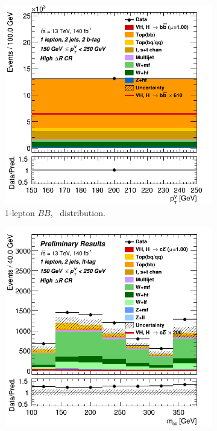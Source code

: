 \begin{figure}[h!]
  \centering
  \begin{subfigure}[b]{0.32\textwidth}
      \centering
      \includegraphics[width=\textwidth]{Images/VH/Own_fit/prefit_VHbb/Region_distpTV_BMax250_BMin150_DCRHigh_J2_TTypebb_T2_L1_Y6051_Prefit.png}
      \caption{1-lepton $BB$, \ptv\ distribution.}
      \label{fig:plots_VHcc_ex_OL_CRH}
  \end{subfigure}
  \begin{subfigure}[b]{0.32\textwidth}
      \centering
      \includegraphics[width=\textwidth]{Images/VH/Own_fit/prefit_VHcc/Region_distmBB_BMax250_BMin150_DCRHigh_J2_TTypelt_T2_L1_Y6051_Prefit.png}

\end{subfigure}
\end{figure}
